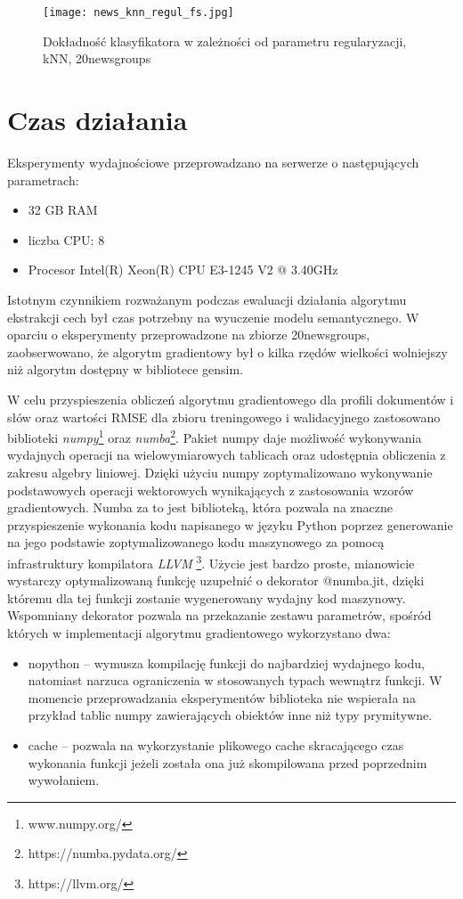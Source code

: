 \documentclass{pracamgr}
\begin{document}
\begin{figure}[]
\centering
  \texttt{[image: news\_knn\_regul\_fs.jpg]}
  \caption{Dokładność klasyfikatora w zależności od parametru regularyzacji, kNN, 20newsgroups}\label{fig:news_knn_regul_fs}
\end{figure}

\section{Czas działania}
Eksperymenty wydajnościowe przeprowadzano na serwerze o następujących parametrach: 
\begin{itemize}
\item 32 GB RAM
\item liczba CPU: 8
\item Procesor Intel(R) Xeon(R) CPU E3-1245 V2 @ 3.40GHz
    
\end{itemize}

Istotnym czynnikiem rozważanym podczas ewaluacji działania algorytmu ekstrakcji cech był czas potrzebny na wyuczenie modelu semantycznego. W oparciu o eksperymenty przeprowadzone na zbiorze 20newsgroups, zaobserwowano, że algorytm gradientowy był o kilka rzędów wielkości wolniejszy niż algorytm dostępny w bibliotece gensim.

W celu przyspieszenia obliczeń algorytmu gradientowego dla profili dokumentów i słów oraz wartości RMSE dla zbioru treningowego i walidacyjnego zastosowano biblioteki \textit{numpy}\footnote{www.numpy.org/} oraz \textit{numba}\footnote{https://numba.pydata.org/}. Pakiet numpy daje możliwość wykonywania wydajnych operacji na wielowymiarowych tablicach oraz udostępnia obliczenia z zakresu algebry liniowej. Dzięki użyciu numpy zoptymalizowano wykonywanie podstawowych operacji wektorowych wynikających z zastosowania wzorów gradientowych. Numba za to jest biblioteką, która pozwala na znaczne przyspieszenie wykonania kodu napisanego w języku Python poprzez generowanie na jego podstawie zoptymalizowanego kodu maszynowego za pomocą infrastruktury kompilatora \textit{LLVM} \footnote{https://llvm.org/}. Użycie jest bardzo proste, mianowicie wystarczy optymalizowaną funkcję uzupełnić o dekorator @numba.jit, dzięki któremu dla tej funkcji zostanie wygenerowany wydajny kod maszynowy. Wspomniany dekorator pozwala na przekazanie zestawu parametrów, spośród których w implementacji algorytmu gradientowego wykorzystano dwa:

\begin{itemize}
    \item nopython -- wymusza kompilację funkcji do najbardziej wydajnego kodu, natomiast narzuca ograniczenia w stosowanych typach wewnątrz funkcji. W momencie przeprowadzania eksperymentów biblioteka nie wspierała na przykład tablic numpy zawierających obiektów inne niż typy prymitywne.
    \item cache -- pozwala na wykorzystanie plikowego cache skracającego czas wykonania funkcji jeżeli została ona już skompilowana przed poprzednim wywołaniem.
\end{itemize}
\end{document}

